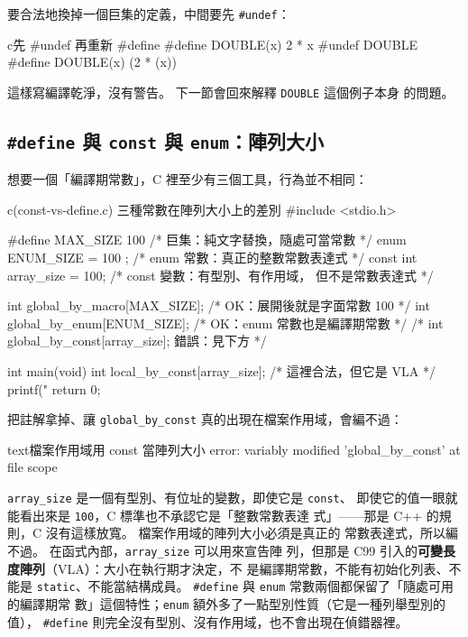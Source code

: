 要合法地換掉一個巨集的定義，中間要先 \texttt{\#undef}：

\begin{code}{c}{先 \#undef 再重新 \#define}
#define DOUBLE(x) 2 * x
#undef DOUBLE
#define DOUBLE(x) (2 * (x))
\end{code}

這樣寫編譯乾淨，沒有警告。 下一節會回來解釋 \texttt{DOUBLE} 這個例子本身
的問題。

\subsection[\#define vs const vs enum]{\texttt{\#define} 與 \texttt{const} 與 \texttt{enum}：陣列大小}

想要一個「編譯期常數」，C 裡至少有三個工具，行為並不相同：

\begin{example}{c}{(const-vs-define.c) 三種常數在陣列大小上的差別}
#include <stdio.h>

#define MAX_SIZE 100          /* 巨集：純文字替換，隨處可當常數 */
enum { ENUM_SIZE = 100 };     /* enum 常數：真正的整數常數表達式 */
const int array_size = 100;   /* const 變數：有型別、有作用域，
                                  但不是常數表達式 */

int global_by_macro[MAX_SIZE]; /* OK：展開後就是字面常數 100 */
int global_by_enum[ENUM_SIZE]; /* OK：enum 常數也是編譯期常數 */
/* int global_by_const[array_size];  錯誤：見下方 */

int main(void) {
    int local_by_const[array_size]; /* 這裡合法，但它是 VLA */
    printf("%
    return 0;
}
\end{example}


把註解拿掉、讓 \texttt{global\_by\_const} 真的出現在檔案作用域，會編不過：

\begin{code}{text}{檔案作用域用 const 當陣列大小}
error: variably modified 'global_by_const' at file scope
\end{code}

\texttt{array\_size} 是一個有型別、有位址的變數，即使它是 \texttt{const}、
即使它的值一眼就能看出來是 \texttt{100}，C 標準也不承認它是「整數常數表達
式」——那是 C++ 的規則，C 沒有這樣放寬。 檔案作用域的陣列大小必須是真正的
常數表達式，所以編不過。 在函式內部，\texttt{array\_size} 可以用來宣告陣
列，但那是 C99 引入的\textbf{可變長度陣列}（VLA）：大小在執行期才決定，不
是編譯期常數，不能有初始化列表、不能是 \texttt{static}、不能當結構成員。
\texttt{\#define} 與 \texttt{enum} 常數兩個都保留了「隨處可用的編譯期常
數」這個特性；\texttt{enum} 額外多了一點型別性質（它是一種列舉型別的值），
\texttt{\#define} 則完全沒有型別、沒有作用域，也不會出現在偵錯器裡。

